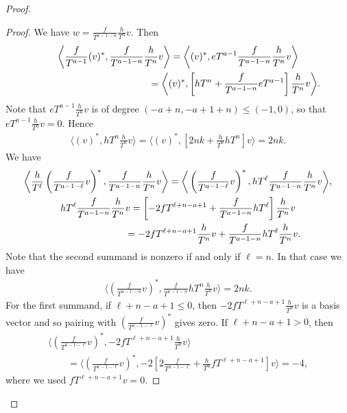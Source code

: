 \begin{proof}
\begin{proof}
We have $w = \frac{f}{T^{a-1-n}}\frac{h}{T^n} v $. Then
\begin{gather*}
\bigg\langle \frac{f}{T^{a-1}} (v)^*, \frac{f}{T^{a-1-n}}\frac{h}{T^n} v \bigg\rangle = \bigg\langle (v)^*, eT^{a-1} \frac{f}{T^{a-1-n}}\frac{h}{T^n} v \bigg\rangle \\
\hphantom{\bigg\langle \frac{f}{T^{a-1}} (v)^*, \frac{f}{T^{a-1-n}}\frac{h}{T^n} v \bigg\rangle }
= \bigg\langle (v)^*, \left[ hT^n + \frac{f}{T^{a-1-n}} eT^{a-1} \right] \frac{h}{T^n} v \bigg\rangle.
\end{gather*}
Note that $eT^{a-1} \frac{h}{T^n}v$ is of degree $(-a+n, -a+1+n) \leq (-1,0)$, so that $eT^{a-1} \frac{h}{T^n} v = 0$. Hence
\begin{gather*}
\bigg\langle (v)^*, hT^n \frac{h}{T^n} v \bigg\rangle = \bigg\langle (v)^*, \left[2nk + \frac{h}{T^n} hT^n\right] v \bigg\rangle = 2 n k.
\end{gather*}
We have
\begin{gather*}
\bigg\langle \frac{h}{T^{\ell}} \left(\frac{f}{T^{a-1-\ell}}v\right)^*,
\frac{f}{T^{a-1-n}}\frac{h}{T^n} v \bigg\rangle = \bigg\langle \left(\frac{f}{T^{a-1-\ell}}v\right)^*, hT^{\ell} \frac{f}{T^{a-1-n}}\frac{h}{T^n} v \bigg\rangle,\\
hT^{\ell} \frac{f}{T^{a-1-n}}\frac{h}{T^n} v = \left[ -2 fT^{\ell+n-a+1} + \frac{f}{T^{a-1-n}} hT^{\ell} \right] \frac{h}{T^n} v \\
\hphantom{hT^{\ell} \frac{f}{T^{a-1-n}}\frac{h}{T^n} v} = -2 fT^{\ell+n-a+1} \frac{h}{T^n} v + \frac{f}{T^{a-1-n}} hT^{\ell} \frac{h}{T^n} v.
\end{gather*}
Note that the second summand is nonzero if and only if $\ell=n$. In that case we have
\begin{gather*}
\bigg\langle \left(\frac{f}{T^{a-1-n}}v\right)^*, \frac{f}{T^{a-1-n}} hT^n \frac{h}{T^n} v \bigg\rangle = 2nk.
\end{gather*}
For the first summand, if $\ell+n-a+1 \leq 0$, then $-2 fT^{\ell+n-a+1} \frac{h}{T^n} v$ is a basis vector and so pairing with $\left(\frac{f}{T^{a-1-\ell}}v\right)^*$ gives zero. If $\ell+n-a+1 > 0$, then
\begin{gather*}
\bigg\langle \left(\frac{f}{T^{a-1-\ell}}v\right)^*, -2 fT^{\ell+n-a+1} \frac{h}{T^n} v \bigg\rangle \\
\qquad {} = \bigg\langle \left(\frac{f}{T^{a-1-\ell}}v\right)^*, -2 \left[ 2\frac{f}{T^{a-1-\ell}} + \frac{h}{T^n} fT^{\ell+n-a+1}\right] v \bigg\rangle = - 4,
\end{gather*}
where we used $fT^{\ell+n-a+1}v = 0$.


\end{proof}
\end{proof}

